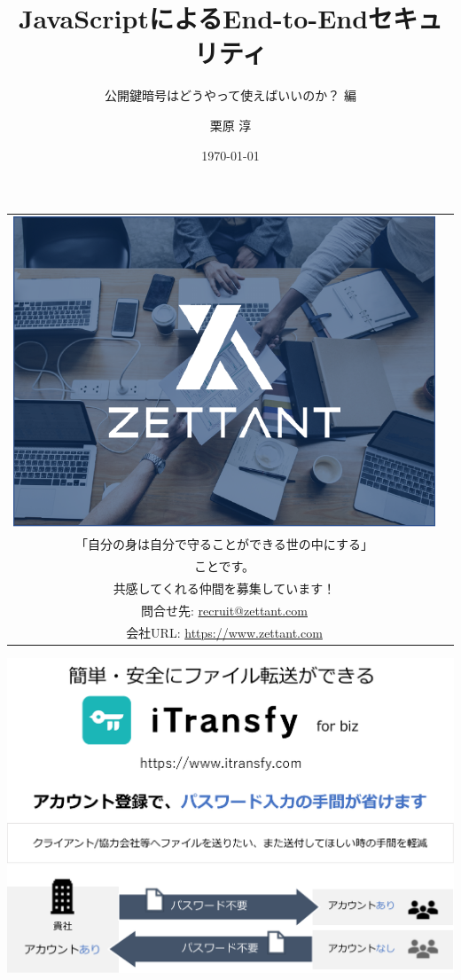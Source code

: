 \documentclass[12pt,dvipdfmx]{beamer}
\title[E2E Security with JS]{JavaScriptによるEnd-to-Endセキュリティ}
\subtitle{公開鍵暗号はどうやって使えばいいのか？ 編}
\author[Jun Kurihara]{栗原 淳}
\institute[]{}
\date[\today]{\today}
\begin{document}
\begin{frame}
\begin{tabular}{cc}
\begin{minipage}[b]{0.3\linewidth}
\includegraphics[width=\linewidth]{Figs/logo.pdf}
\vspace{3ex}
\end{minipage}
 & 
\begin{minipage}[b]{0.7\linewidth}
\footnotesize
ゼタントはのミッションは、\\

「自分の身は自分で守ることができる世の中にする」\\

ことです。\\
共感してくれる仲間を募集しています！\\

問合せ先: \url{recruit@zettant.com}\\
会社URL: \url{https://www.zettant.com}
\end{minipage}
\end{tabular}
\end{frame}

\begin{frame}
\includegraphics[width=\linewidth]{Figs/itransfy.pdf}
\end{frame}

\end{document}
